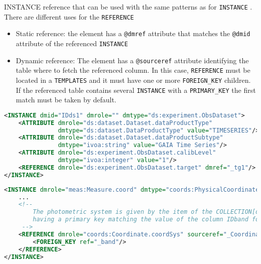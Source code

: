INSTANCE reference that can be used with the same patterns as for \texttt{INSTANCE} .
There are different uses for the \texttt{REFERENCE} 

\begin{itemize}
    \item Static reference: the element has a \texttt{@dmref} attribute that matches the \texttt{@dmid} attribute of the referenced \texttt{INSTANCE} 
    \item Dynamic reference: The element has a \texttt{@sourceref} attribute identifying  the table where to fetch the referenced column.   
             In this case, \texttt{REFERENCE} must be located in a \texttt{TEMPLATES} and it must have one or more \texttt{FOREIGN\_KEY} children. 
             If the referenced table contains several \texttt{INSTANCE} with a \texttt{PRIMARY\_KEY}  the first match must be taken by default.
\end{itemize}

\begin{lstlisting}[caption={Simple \texttt{REFERENCE}, to be replaced with the \texttt{INSTANCE} having \texttt{@dmid=\_tg1} (see line~\ref{REFERENCE_snippet_1} in Appendix~\ref{appendix_A}).},language=XML]
<INSTANCE dmid="IDds1" dmrole="" dmtype="ds:experiment.ObsDataset">
    <ATTRIBUTE dmrole="ds:dataset.Dataset.dataProductType" 
               dmtype="ds:dataset.DataProductType" value="TIMESERIES"/>
    <ATTRIBUTE dmrole="ds:dataset.Dataset.dataProductSubtype" 
               dmtype="ivoa:string" value="GAIA Time Series"/>
    <ATTRIBUTE dmrole="ds:experiment.ObsDataset.calibLevel" 
               dmtype="ivoa:integer" value="1"/>
    <REFERENCE dmrole="ds:experiment.ObsDataset.target" dmref="_tg1"/>
</INSTANCE>

\end{lstlisting}

\begin{lstlisting}[caption={Dynamic \texttt{REFERENCE}, 
                            to be replaced with the \texttt{INSTANCE} of the table of collection \texttt{\_CoordinateSystems} 
                            and having a \texttt{PRIMARY\_KEY} matching the value of the column  \texttt{\_band}.
                            This pattern is valid in the context of a TEMPLATES
                            (see line~\ref{REFERENCE_snippet_2}).},language=XML]
<INSTANCE dmrole="meas:Measure.coord" dmtype="coords:PhysicalCoordinate">
    ...
    <!--
        The photometric system is given by the item of the COLLECTION[dmid=IDCoordinateSystems]
        having a primary key matching the value of the column IDband for that particular row
     -->
    <REFERENCE dmrole="coords:Coordinate.coordSys" sourceref="_CoordinateSystems">
        <FOREIGN_KEY ref="_band"/>
    </REFERENCE>
</INSTANCE>
\end{lstlisting}


